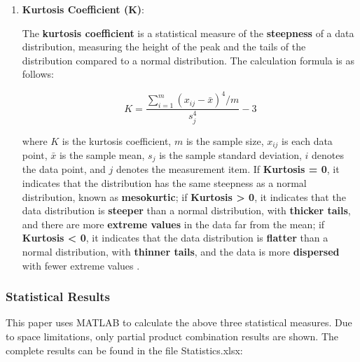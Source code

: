 \documentclass{article}
\begin{document}
\begin{enumerate}
		\item \textbf{Kurtosis Coefficient (K)}:
		
		The \textbf{kurtosis coefficient} is a statistical measure of the \textbf{steepness} of a data distribution, measuring the height of the peak and the tails of the distribution compared to a normal distribution. The calculation formula is as follows:
		
		\begin{equation}
			K = \frac{\sum_{i=1}^{m} (x_{ij} - \bar{x})^4 / m}{s_j^4} - 3
			\label{eq:k}
		\end{equation}
		
		where \(K\) is the kurtosis coefficient, \(m\) is the sample size, \(x_{ij}\) is each data point, \(\bar{x}\) is the sample mean, \(s_j\) is the sample standard deviation, \(i\) denotes the data point, and \(j\) denotes the measurement item. If \textbf{Kurtosis = 0}, it indicates that the distribution has the same steepness as a normal distribution, known as \textbf{mesokurtic}; if \textbf{Kurtosis > 0}, it indicates that the data distribution is \textbf{steeper} than a normal distribution, with \textbf{thicker tails}, and there are more \textbf{extreme values} in the data far from the mean; if \textbf{Kurtosis < 0}, it indicates that the data distribution is \textbf{flatter} than a normal distribution, with \textbf{thinner tails}, and the data is more \textbf{dispersed} with fewer extreme values \cite{3}.
	\end{enumerate}
	
	\subsubsection{Statistical Results}
	
	This paper uses MATLAB to calculate the above three statistical measures. Due to space limitations, only partial product combination results are shown. The complete results can be found in the file Statistics.xlsx:
	
\end{document}
